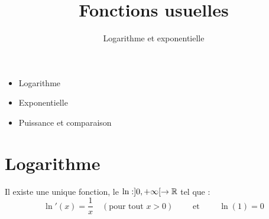 





\title{{\bf Fonctions usuelles}}
\subtitle{Logarithme et exponentielle}




\begin{frame}
  
  \debutmontitre

  \pause

{\footnotesize
\hfill
{}
\begin{minipage}{0.6\textwidth}
  \begin{itemize}
    \item<3-> Logarithme
    \item<4-> Exponentielle
    \item<5-> Puissance et comparaison
  \end{itemize}
\end{minipage}
}

\end{frame}
\setcounter{framenumber}{0}



\section{Logarithme}

\begin{frame}


\begin{proposition}
Il existe une unique fonction, le  $\ln : ]0,+\infty[ \to \mathbb{R}$ tel que :
$$\ln'(x) = \frac 1x \quad (\text{pour tout } x>0) \qquad \text { et } \qquad \ln(1) = 0$$
\end{proposition}

\end{frame}


